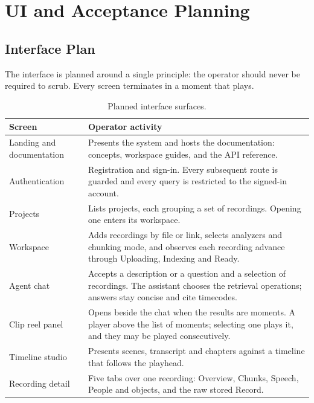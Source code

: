 \documentclass[11pt,a4paper]{article}
\begin{document}
\section{UI and Acceptance Planning}

\subsection{Interface Plan}

The interface is planned around a single principle: the operator should never be
required to scrub. Every screen terminates in a moment that plays.

\begin{table}[htbp]
\centering
\small
\begin{tabularx}{\textwidth}{@{}L{3.2cm}X@{}}
\toprule
\textbf{Screen} & \textbf{Operator activity} \\
\midrule
Landing and documentation & Presents the system and hosts the documentation: concepts, workspace guides, and the API reference. \\
Authentication & Registration and sign-in. Every subsequent route is guarded and every query is restricted to the signed-in account. \\
Projects & Lists projects, each grouping a set of recordings. Opening one enters its workspace. \\
Workspace & Adds recordings by file or link, selects analyzers and chunking mode, and observes each recording advance through Uploading, Indexing and Ready. \\
Agent chat & Accepts a description or a question and a selection of recordings. The assistant chooses the retrieval operations; answers stay concise and cite timecodes. \\
Clip reel panel & Opens beside the chat when the results are moments. A player above the list of moments; selecting one plays it, and they may be played consecutively. \\
Timeline studio & Presents scenes, transcript and chapters against a timeline that follows the playhead. \\
Recording detail & Five tabs over one recording: Overview, Chunks, Speech, People and objects, and the raw stored Record. \\
\bottomrule
\end{tabularx}
\caption{Planned interface surfaces.}
\end{table}
\end{document}

